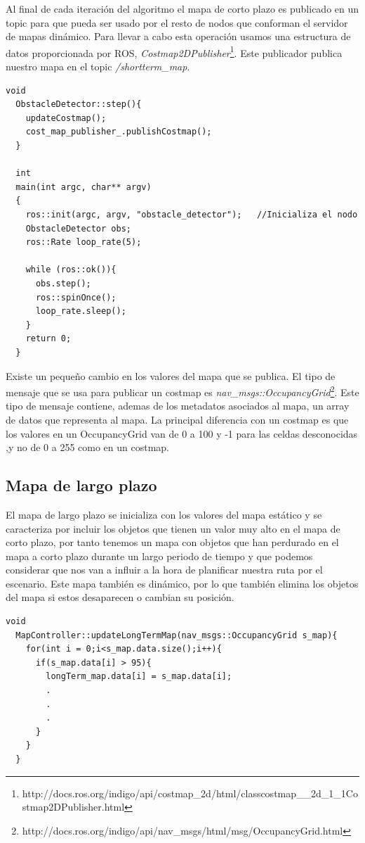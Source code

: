 Al final de cada iteración del algoritmo el mapa de corto plazo es publicado en un topic para que pueda ser usado por el resto de nodos que conforman el servidor de mapas dinámico. Para llevar a cabo esta operación usamos una estructura de datos proporcionada por ROS, \textit{Costmap2DPublisher}\footnote{http://docs.ros.org/indigo/api/costmap\_2d/html/classcostmap\_\_2d\_1\_1Costmap2DPublisher.html}. Este publicador publica nuestro mapa en el topic \textit{/shortterm\_map}.


\renewcommand{\lstlistingname}{Código}
\begin{lstlisting}[caption=Step del nodo obstacle\_detector, label={lst:stepobstacledetector}]
  void
  ObstacleDetector::step(){
    updateCostmap();
    cost_map_publisher_.publishCostmap();
  }

  int
  main(int argc, char** argv)
  {
    ros::init(argc, argv, "obstacle_detector");   //Inicializa el nodo
    ObstacleDetector obs;
    ros::Rate loop_rate(5);

    while (ros::ok()){
      obs.step();
      ros::spinOnce();
      loop_rate.sleep();
    }
    return 0;
  }

\end{lstlisting}

Existe un pequeño cambio en los valores del mapa que se publica. El tipo de mensaje que se usa para publicar un costmap es \textit{nav\_msgs::OccupancyGrid}\footnote{http://docs.ros.org/indigo/api/nav\_msgs/html/msg/OccupancyGrid.html}. Este tipo de mensaje contiene, ademas de los metadatos asociados al mapa, un array de datos que representa al mapa. La principal diferencia con un costmap es que los valores en un OccupancyGrid van de 0 a 100 y -1 para las celdas desconocidas ,y no de 0 a 255 como en un costmap.

\subsection{Mapa de largo plazo}
El mapa de largo plazo se inicializa con los valores del mapa estático y se caracteriza por incluir los objetos que tienen un valor muy alto en el mapa de corto plazo, por tanto tenemos un mapa con objetos que han perdurado en el mapa a corto plazo durante un largo periodo de tiempo y que podemos considerar que nos van a influir a la hora de planificar nuestra ruta por el escenario. 
Este mapa también es dinámico, por lo que también elimina los objetos del mapa si estos desaparecen o cambian su posición.


\begin{lstlisting}[caption=Procedimiento para añadir un objeto al mapa de largo plazo, label={lst:addobjectlongmap}]
  void
  MapController::updateLongTermMap(nav_msgs::OccupancyGrid s_map){
    for(int i = 0;i<s_map.data.size();i++){
      if(s_map.data[i] > 95){
        longTerm_map.data[i] = s_map.data[i]; 
        .
        .
        .
      }
    }
  }

\end{lstlisting}


